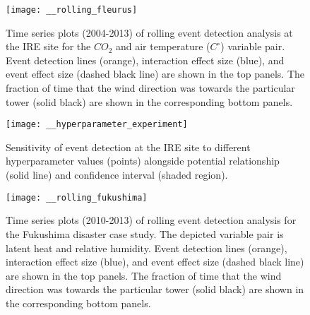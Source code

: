 \documentclass{article}
\begin{document}
\begin{figure}
	\centering
	\texttt{[image: \_\_rolling\_fleurus]}
	\caption{Time series plots (2004-2013) of rolling event detection analysis at the IRE site for the $CO_2$ and air temperature ($C^{\circ}$) variable pair. Event detection lines (orange), interaction effect size (blue), and event effect size (dashed black line) are shown in the top panels. The fraction of time that the wind direction was towards the particular tower (solid black) are shown in the corresponding bottom panels.}
	\label{fig:rolling}
\end{figure}

\begin{figure}
	\centering
	\texttt{[image: \_\_hyperparameter\_experiment]}
	\caption{Sensitivity of event detection at the IRE site to different hyperparameter values (points) alongside potential relationship (solid line) and confidence interval (shaded region).}
	\label{fig:hyperparameter}
\end{figure}

\begin{figure}
	\centering
	\texttt{[image: \_\_rolling\_fukushima]}
	\caption{Time series plots (2010-2013) of rolling event detection analysis for the Fukushima disaster case study. The depicted variable pair is latent heat and relative humidity. Event detection lines (orange), interaction effect size (blue), and event effect size (dashed black line) are shown in the top panels. The fraction of time that the wind direction was towards the particular tower (solid black) are shown in the corresponding bottom panels.}
	\label{fig:fukushima}
\end{figure}
\end{document}
